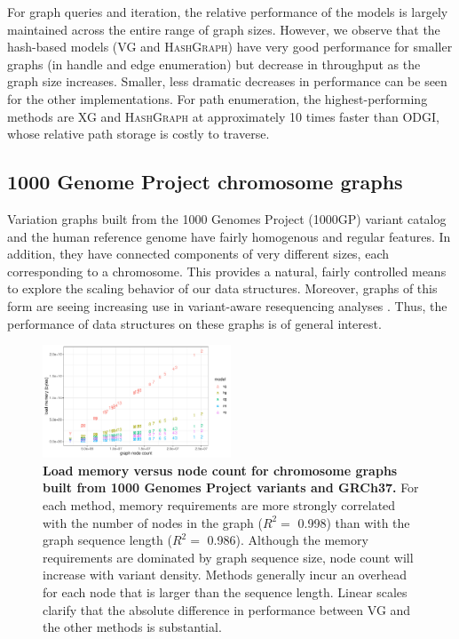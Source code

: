 \documentclass[11pt]{ucthesis}
\begin{document}
For graph queries and iteration, the relative performance of the models is largely maintained across the entire range of graph sizes.
However, we observe that the hash-based models (\textsc{VG} and \textsc{HashGraph}) have very good performance for smaller graphs (in handle and edge enumeration) but decrease in throughput as the graph size increases.
Smaller, less dramatic decreases in performance can be seen for the other implementations.
For path enumeration, the highest-performing methods are \textsc{XG} and \textsc{HashGraph} at approximately 10 times faster than \textsc{ODGI}, whose relative path storage is costly to traverse.

\subsection{1000 Genome Project chromosome graphs}

Variation graphs built from the 1000 Genomes Project (1000GP) variant catalog and the human reference genome have fairly homogenous and regular features.
In addition, they have connected components of very different sizes, each corresponding to a chromosome.
This provides a natural, fairly controlled means to explore the scaling behavior of our data structures.
Moreover, graphs of this form are seeing increasing use in variant-aware resequencing analyses \cite{crysnanto2020bovine}.
Thus, the performance of data structures on these graphs is of general interest.

\begin{figure}[p]
  \centering
  \includegraphics[width=0.5\textwidth]{handlefigures/1000gp_chroms_node_count.pdf}
  \caption{
    \label{fig:1000GPchroms}
    \textbf{Load memory versus node count for chromosome graphs built from 1000 Genomes Project variants and GRCh37.}
    For each method, memory requirements are more strongly correlated with the number of nodes in the graph ($R^2 =$ 0.998) than with the graph sequence length ($R^2 =$ 0.986).
    Although the memory requirements are dominated by graph sequence size, node count will increase with variant density.
    Methods generally incur an overhead for each node that is larger than the sequence length.
    Linear scales clarify that the absolute difference in performance between \textsc{VG} and the other methods is substantial.
    }
\end{figure}
\end{document}
